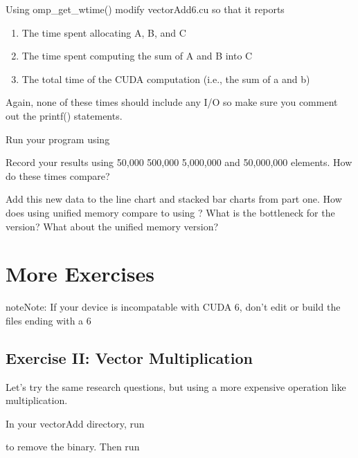 \documentclass[letterpaper,10pt,openany,oneside]{sphinxmanual}
\begin{document}
Using omp\_get\_wtime() modify vectorAdd6.cu so that it reports
\begin{enumerate}
\item {} 
The time spent allocating A, B, and C

\item {} 
The time spent computing the sum of A and B into C

\item {} 
The total time of the CUDA computation (i.e., the sum of a and b)

\end{enumerate}

Again, none of these times should include any I/O so make sure you comment out
the printf() statements.

Run your program using


Record your results using 50,000 500,000 5,000,000 and
50,000,000 elements. How do these times compare?

Add this new data to the line chart and stacked bar charts from part one.
How does using unified memory compare to using ?
What is the bottleneck for the  version? What about
the unified memory version?


\chapter{More Exercises}
\label{2-MoreExercises/MoreExercises:more-exercises}\label{2-MoreExercises/MoreExercises::doc}
\begin{notice}{note}{Note:}
If your device is incompatable with CUDA 6, don't edit or build the files ending with a 6
\end{notice}


\section{Exercise II: Vector Multiplication}
\label{2-MoreExercises/MoreExercises:exercise-ii-vector-multiplication}
Let's try the same research questions, but using a more expensive operation like multiplication.

In your vectorAdd directory, run
\begin{quote}

\end{quote}

to remove the binary. Then run
\begin{quote}


\end{quote}
\end{document}
